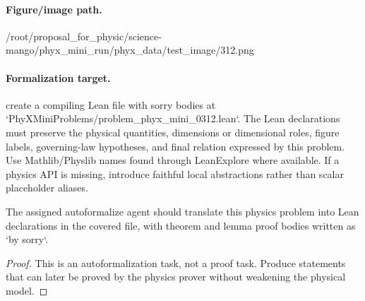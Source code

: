 \paragraph{Figure/image path.}
/root/proposal\_for\_physic/science-mango/phyx\_mini\_run/phyx\_data/test\_image/312.png

\paragraph{Formalization target.}
create a compiling Lean file with sorry bodies at `PhyXMiniProblems/problem\_phyx\_mini\_0312.lean`. The Lean declarations must preserve the physical quantities, dimensions or dimensional roles, figure labels, governing-law hypotheses, and final relation expressed by this problem.
Use Mathlib/Physlib names found through LeanExplore where available. If a physics API is missing, introduce faithful local abstractions rather than scalar placeholder aliases.

\begin{theorem}
\label{thm:physics:phyx_mini_0312:target}
The assigned autoformalize agent should translate this physics problem into Lean declarations in the covered file, with theorem and lemma proof bodies written as `by sorry`.
\end{theorem}
\begin{proof}
This is an autoformalization task, not a proof task. Produce statements that can later be proved by the physics prover without weakening the physical model.
\end{proof}

